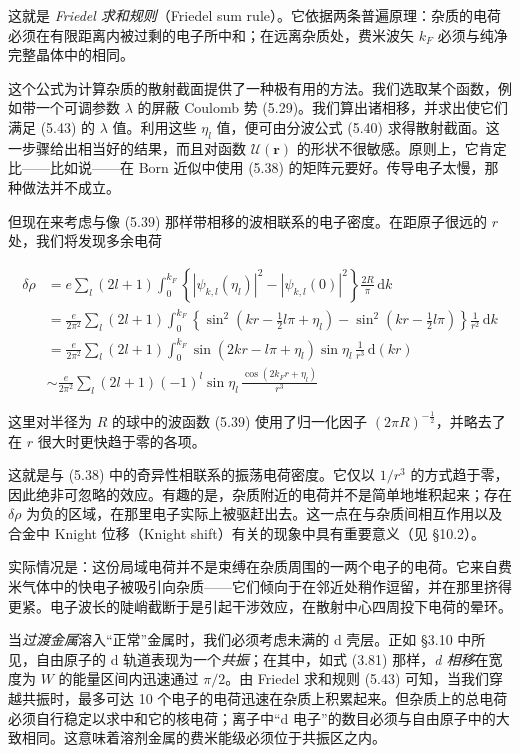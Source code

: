 这就是 \emph{Friedel 求和规则}（Friedel sum rule）。它依据两条普遍原理：杂质的电荷必须在有限距离内被过剩的电子所中和；在远离杂质处，费米波矢 $k_F$ 必须与纯净完整晶体中的相同。

这个公式为计算杂质的散射截面提供了一种极有用的方法。我们选取某个函数，例如带一个可调参数 $\lambda$ 的屏蔽 Coulomb 势 (5.29)。我们算出诸相移，并求出使它们满足 (5.43) 的 $\lambda$ 值。利用这些 $\eta_l$ 值，便可由分波公式 (5.40) 求得散射截面。这一步骤给出相当好的结果，而且对函数 $\mathcal{U}(\mathbf{r})$ 的形状不很敏感。原则上，它肯定比——比如说——在 Born 近似中使用 (5.38) 的矩阵元要好。传导电子太慢，那种做法并不成立。

但现在来考虑与像 (5.39) 那样带相移的波相联系的电子密度。在距原子很远的 $r$ 处，我们将发现多余电荷

\begin{align*}
\delta\rho &= e \sum_l (2l+1) \int_0^{k_F} \left\{ |\psi_{k,l}(\eta_l)|^2 - |\psi_{k,l}(0)|^2 \right\} \frac{2R}{\pi}\, \mathrm{d}k \\
&= \frac{e}{2\pi^2} \sum_l (2l+1) \int_0^{k_F} \left\{ \sin^2\left(kr - \tfrac{1}{2}l\pi + \eta_l\right) - \sin^2\left(kr - \tfrac{1}{2}l\pi\right) \right\} \frac{1}{r^2}\, \mathrm{d}k \\
&= \frac{e}{2\pi^2} \sum_l (2l+1) \int_0^{k_F} \sin\left(2kr - l\pi + \eta_l\right) \sin\eta_l \, \frac{1}{r^3}\, \mathrm{d}(kr) \\
&\sim \frac{e}{2\pi^2} \sum_l (2l+1) \left(-1\right)^l \sin\eta_l \, \frac{\cos(2k_F r + \eta_l)}{r^3}
\tag{5.44}
\end{align*}

这里对半径为 $R$ 的球中的波函数 (5.39) 使用了归一化因子 $(2\pi R)^{-\frac{1}{2}}$，并略去了在 $r$ 很大时更快趋于零的各项。

这就是与 (5.38) 中的奇异性相联系的振荡电荷密度。它仅以 $1/r^3$ 的方式趋于零，因此绝非可忽略的效应。有趣的是，杂质附近的电荷并不是简单地堆积起来；存在 $\delta\rho$ 为负的区域，在那里电子实际上被驱赶出去。这一点在与杂质间相互作用以及合金中 Knight 位移（Knight shift）有关的现象中具有重要意义（见 §10.2）。

实际情况是：这份局域电荷并不是束缚在杂质周围的一两个电子的电荷。它来自费米气体中的快电子被吸引向杂质——它们倾向于在邻近处稍作逗留，并在那里挤得更紧。电子波长的陡峭截断于是引起干涉效应，在散射中心四周投下电荷的晕环。


当\emph{过渡金属}溶入“正常”金属时，我们必须考虑未满的 d 壳层。正如 §3.10 中所见，自由原子的 d 轨道表现为一个\emph{共振}；在其中，如式 (3.81) 那样，\emph{d 相移}在宽度为 $W$ 的能量区间内迅速通过 $\pi/2$。由 Friedel 求和规则 (5.43) 可知，当我们穿越共振时，最多可达 10 个电子的电荷迅速在杂质上积累起来。但杂质上的总电荷必须自行稳定以求中和它的核电荷；离子中“d 电子”的数目必须与自由原子中的大致相同。这意味着溶剂金属的费米能级必须位于共振区之内。

